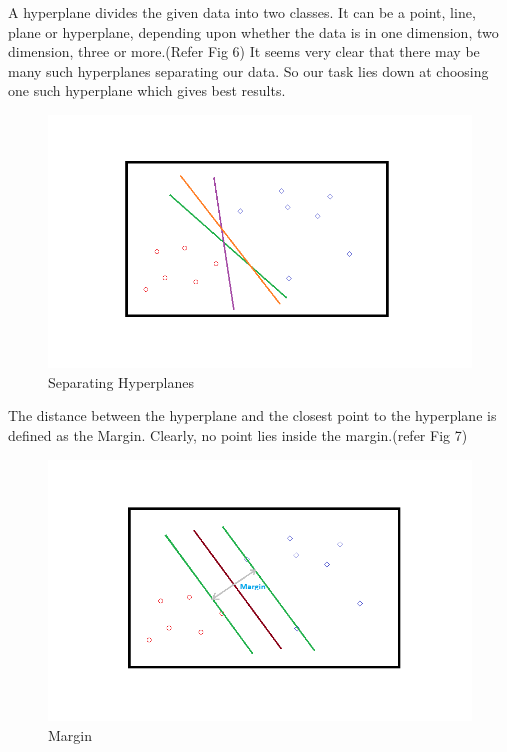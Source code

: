 A hyperplane divides the given data into two classes. It can be a point, line, plane or hyperplane, depending upon whether the data is in one dimension, two dimension, three or more.(Refer Fig 6)
It seems very clear that there may be many such hyperplanes separating our data. So our task lies down at choosing one such hyperplane which gives best results.~\cite{svm}

\begin{figure}
  \centering
  \includegraphics[scale=.6]{kachra1.png}
  \caption{Separating Hyperplanes ~\cite{svm}}
  
\end{figure}

The distance between the hyperplane and the closest point to the hyperplane is defined as the Margin. Clearly, no point lies inside the margin.(refer Fig 7)

\begin{figure}
  \centering
  \includegraphics[scale=.6]{kachra2.png}
  \caption{Margin ~\cite{svm}}
  
\end{figure}

